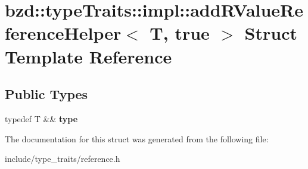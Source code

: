 \hypertarget{structbzd_1_1typeTraits_1_1impl_1_1addRValueReferenceHelper_3_01T_00_01true_01_4}{}\section{bzd\+:\+:type\+Traits\+:\+:impl\+:\+:add\+R\+Value\+Reference\+Helper$<$ T, true $>$ Struct Template Reference}
\label{structbzd_1_1typeTraits_1_1impl_1_1addRValueReferenceHelper_3_01T_00_01true_01_4}
\subsection*{Public Types}
\begin{DoxyCompactItemize}
\item 
\mbox{\label{structbzd_1_1typeTraits_1_1impl_1_1addRValueReferenceHelper_3_01T_00_01true_01_4_a1d088c93680f43c848fc5bc93644fb78}} 
typedef T \&\& {\bfseries type}
\end{DoxyCompactItemize}


The documentation for this struct was generated from the following file\+:\begin{DoxyCompactItemize}
\item 
include/type\+\_\+traits/reference.\+h\end{DoxyCompactItemize}
